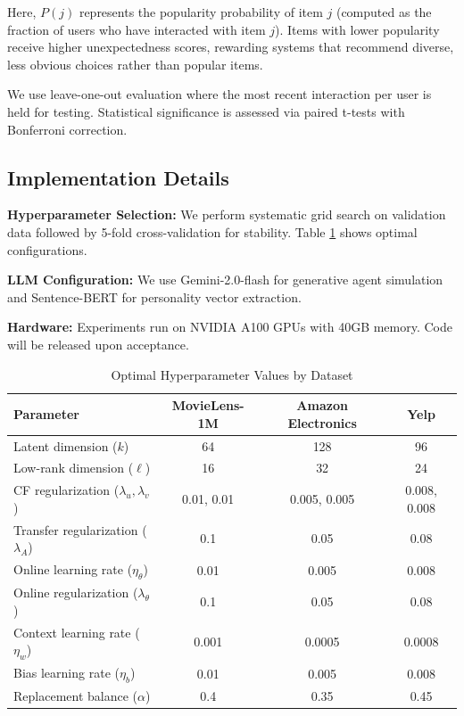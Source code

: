 \documentclass[acmsmall]{acmart}
\begin{document}
Here, $P(j)$ represents the popularity probability of item $j$ (computed as the fraction of users who have interacted with item $j$). Items with lower popularity receive higher unexpectedness scores, rewarding systems that recommend diverse, less obvious choices rather than popular items.

We use leave-one-out evaluation where the most recent interaction per user is held for testing. Statistical significance is assessed via paired t-tests with Bonferroni correction.

\subsection{Implementation Details}
\textbf{Hyperparameter Selection:} We perform systematic grid search on validation data followed by 5-fold cross-validation for stability. Table \ref{tab:hyperparams} shows optimal configurations.

\textbf{LLM Configuration:} We use Gemini-2.0-flash for generative agent simulation and Sentence-BERT for personality vector extraction.

\textbf{Hardware:} Experiments run on NVIDIA A100 GPUs with 40GB memory. Code will be released upon acceptance.

\begin{table}[h]
\centering
\caption{Optimal Hyperparameter Values by Dataset}
\label{tab:hyperparams}
\small
\begin{tabular}{lccc}
\toprule
\textbf{Parameter} & \textbf{MovieLens-1M} & \textbf{Amazon Electronics} & \textbf{Yelp} \\
\midrule
Latent dimension ($k$) & 64 & 128 & 96 \\
Low-rank dimension ($\ell$) & 16 & 32 & 24 \\
CF regularization ($\lambda_u, \lambda_v$) & 0.01, 0.01 & 0.005, 0.005 & 0.008, 0.008 \\
Transfer regularization ($\lambda_A$) & 0.1 & 0.05 & 0.08 \\
Online learning rate ($\eta_\theta$) & 0.01 & 0.005 & 0.008 \\
Online regularization ($\lambda_\theta$) & 0.1 & 0.05 & 0.08 \\
Context learning rate ($\eta_w$) & 0.001 & 0.0005 & 0.0008 \\
Bias learning rate ($\eta_b$) & 0.01 & 0.005 & 0.008 \\
Replacement balance ($\alpha$) & 0.4 & 0.35 & 0.45 \\
\bottomrule
\end{tabular}
\end{table}
\end{document}
